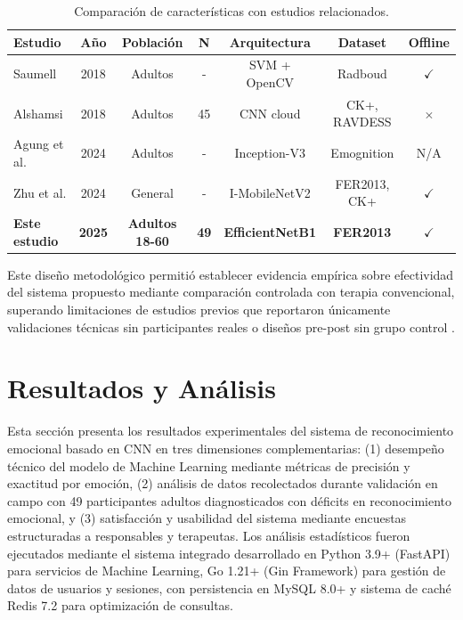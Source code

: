 \documentclass[journal,article,submit,pdftex,moreauthors]{Definitions/mdpi}
\begin{document}
	\begin{table}[H]
		\caption{Comparación de características con estudios relacionados.\label{tab2}}
		\small
		\begin{tabularx}{\textwidth}{lcccccc}
			\toprule
			\textbf{Estudio} & \textbf{Año} & \textbf{Población} & \textbf{N} & \textbf{Arquitectura} & \textbf{Dataset} & \textbf{Offline} \\
			\midrule
			Saumell \cite{ref2} & 2018 & Adultos & - & SVM + OpenCV & Radboud & $\checkmark$ \\
			Alshamsi \cite{ref1} & 2018 & Adultos & 45 & CNN cloud & CK+, RAVDESS & $\times$ \\
			Agung et al. \cite{ref7} & 2024 & Adultos & - & Inception-V3 & Emognition & N/A \\
			Zhu et al. \cite{ref3} & 2024 & General & - & I-MobileNetV2 & FER2013, CK+ & $\checkmark$ \\
			\textbf{Este estudio} & \textbf{2025} & \textbf{Adultos 18-60} & \textbf{49} & \textbf{EfficientNetB1} & \textbf{FER2013} & $\checkmark$ \\
			\bottomrule
		\end{tabularx}
	\end{table}
	
	Este diseño metodológico permitió establecer evidencia empírica sobre efectividad del sistema propuesto mediante comparación controlada con terapia convencional, superando limitaciones de estudios previos que reportaron únicamente validaciones técnicas sin participantes reales o diseños pre-post sin grupo control \cite{ref2,ref3,ref5,ref7}.
	
	\section{Resultados y Análisis}
	
	Esta sección presenta los resultados experimentales del sistema de reconocimiento emocional basado en CNN en tres dimensiones complementarias: (1) desempeño técnico del modelo de Machine Learning mediante métricas de precisión y exactitud por emoción, (2) análisis de datos recolectados durante validación en campo con 49 participantes adultos diagnosticados con déficits en reconocimiento emocional, y (3) satisfacción y usabilidad del sistema mediante encuestas estructuradas a responsables y terapeutas. Los análisis estadísticos fueron ejecutados mediante el sistema integrado desarrollado en Python 3.9+ (FastAPI) para servicios de Machine Learning, Go 1.21+ (Gin Framework) para gestión de datos de usuarios y sesiones, con persistencia en MySQL 8.0+ y sistema de caché Redis 7.2 para optimización de consultas.
	
\end{document}
